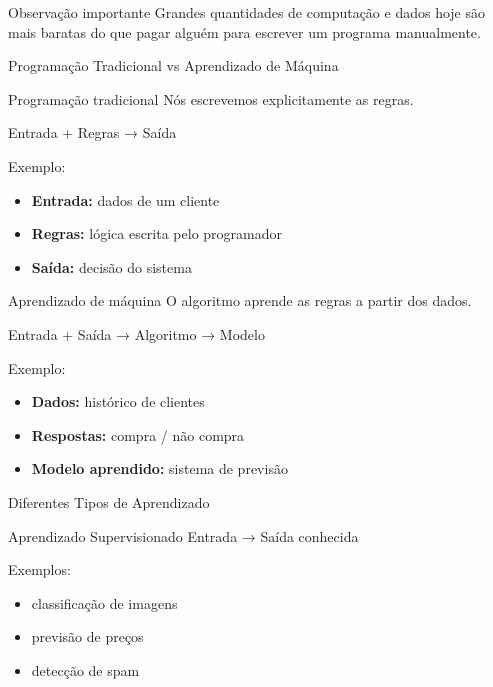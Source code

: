 \documentclass[
  ignorenonframetext,
  aspectratio=169,
]{beamer}
\providecommand{\tightlist}{%
  \setlength{\itemsep}{0pt}\setlength{\parskip}{0pt}}
\begin{document}
\begin{frame}
\begin{block}{Observação importante}
\label{observauxe7uxe3o-importante}
{ Grandes quantidades de computação e dados hoje são mais baratas do que
pagar alguém para escrever um programa manualmente. }
\end{block}
\end{frame}

\begin{frame}{Programação Tradicional vs Aprendizado de Máquina}
\label{programauxe7uxe3o-tradicional-vs-aprendizado-de-muxe1quina}
\begin{block}{Programação tradicional}
\label{programauxe7uxe3o-tradicional}
Nós escrevemos explicitamente as regras.

{Entrada + Regras → Saída}

Exemplo:

\begin{itemize}
\tightlist
\item
  \textbf{Entrada:} dados de um cliente
\item
  \textbf{Regras:} lógica escrita pelo programador
\item
  \textbf{Saída:} decisão do sistema
\end{itemize}
\end{block}
\end{frame}

\begin{frame}
\begin{block}{Aprendizado de máquina}
\label{aprendizado-de-muxe1quina}
O algoritmo aprende as regras a partir dos dados.

{Entrada + Saída → Algoritmo → Modelo}

Exemplo:

\begin{itemize}
\tightlist
\item
  \textbf{Dados:} histórico de clientes
\item
  \textbf{Respostas:} compra / não compra
\item
  \textbf{Modelo aprendido:} sistema de previsão
\end{itemize}
\end{block}
\end{frame}

\begin{frame}{Diferentes Tipos de Aprendizado}
\label{diferentes-tipos-de-aprendizado}
\begin{block}{Aprendizado Supervisionado}
\label{aprendizado-supervisionado}
{Entrada → Saída conhecida}

Exemplos:

\begin{itemize}
\tightlist
\item
  classificação de imagens
\item
  previsão de preços
\item
  detecção de spam
\end{itemize}
\end{block}
\end{frame}
\end{document}
